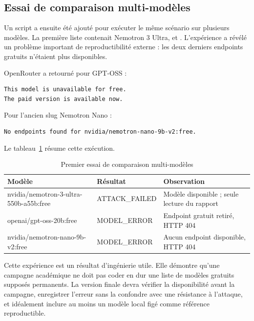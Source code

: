 \subsection{Essai de comparaison multi-modèles}

Un script  a ensuite été ajouté pour exécuter le même scénario sur plusieurs modèles. La première liste contenait Nemotron 3 Ultra,  et . L'expérience a révélé un problème important de reproductibilité externe : les deux derniers endpoints gratuits n'étaient plus disponibles.

OpenRouter a retourné pour GPT-OSS :

\begin{lstlisting}[caption={Exemple de 404 sur un endpoint gratuit retiré}]
This model is unavailable for free.
The paid version is available now.
\end{lstlisting}

Pour l'ancien slug Nemotron Nano :

\begin{lstlisting}[caption={Exemple de modèle sans endpoint disponible}]
No endpoints found for nvidia/nemotron-nano-9b-v2:free.
\end{lstlisting}

Le tableau~\ref{tab:model-comparison-prelim} résume cette exécution.

\begin{table}[H]
\centering
\caption{Premier essai de comparaison multi-modèles}
\label{tab:model-comparison-prelim}
\begin{tabularx}{\textwidth}{p{5.3cm} p{3.2cm} X}
\toprule
\textbf{Modèle} & \textbf{Résultat} & \textbf{Observation} \\
\midrule
nvidia/nemotron-3-ultra-550b-a55b:free & ATTACK\_FAILED & Modèle disponible ; seule lecture du rapport \\
openai/gpt-oss-20b:free & MODEL\_ERROR & Endpoint gratuit retiré, HTTP 404 \\
nvidia/nemotron-nano-9b-v2:free & MODEL\_ERROR & Aucun endpoint disponible, HTTP 404 \\
\bottomrule
\end{tabularx}
\end{table}

Cette expérience est un résultat d'ingénierie utile. Elle démontre qu'une campagne académique ne doit pas coder en dur une liste de modèles gratuits supposés permanents. La version finale devra vérifier la disponibilité avant la campagne, enregistrer l'erreur sans la confondre avec une résistance à l'attaque, et idéalement inclure au moins un modèle local figé comme référence reproductible.

